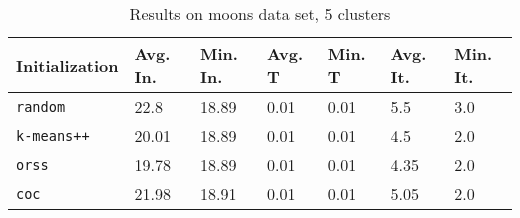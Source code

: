 \begin{table}[h]
	\begin{center}
		\begin{tabular}{|l|l|l|l|l|l|l|}
			\hline
			Initialization & Avg. In. & Min. In. & Avg. T & Min. T & Avg. It. & Min. It.\\\hline
			\texttt{random} & 22.8 & 18.89 & 0.01 & 0.01 & 5.5 & 3.0\\\hline
			\texttt{k-means++} & 20.01 & 18.89 & 0.01 & 0.01 & 4.5 & 2.0\\\hline
			\texttt{orss} & 19.78 & 18.89 & 0.01 & 0.01 & 4.35 & 2.0\\\hline
			\texttt{coc} & 21.98 & 18.91 & 0.01 & 0.01 & 5.05 & 2.0\\\hline
		\end{tabular}
		\caption{Results on moons data set, 5 clusters}
		\label{tbl:moons5}
	\end{center}
\end{table}

